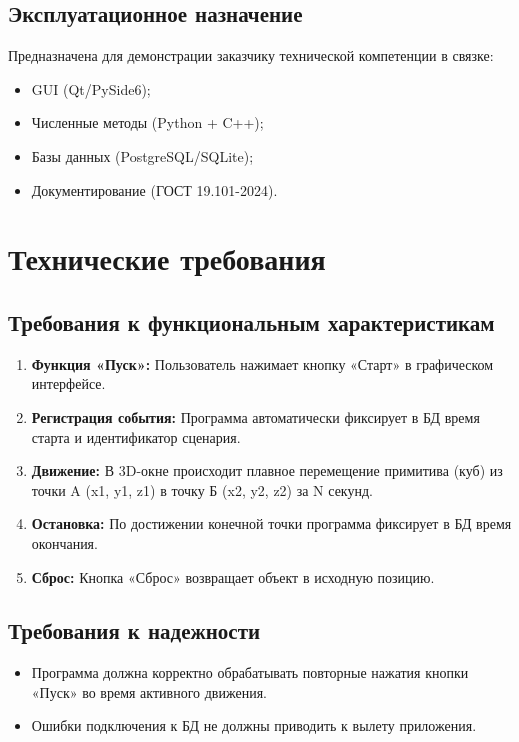\documentclass[a4paper,14pt]{extarticle}
\begin{document}
\subsection{Эксплуатационное назначение}
Предназначена для демонстрации заказчику технической компетенции в связке:
\begin{itemize}
    \item GUI (Qt/PySide6);
    \item Численные методы (Python + C++);
    \item Базы данных (PostgreSQL/SQLite);
    \item Документирование (ГОСТ 19.101-2024).
\end{itemize}

\section{Технические требования}

\subsection{Требования к функциональным характеристикам}
\begin{enumerate}
    \item \textbf{Функция «Пуск»:} Пользователь нажимает кнопку «Старт» в графическом интерфейсе.
    \item \textbf{Регистрация события:} Программа автоматически фиксирует в БД время старта и идентификатор сценария.
    \item \textbf{Движение:} В 3D-окне происходит плавное перемещение примитива (куб) из точки A (x1, y1, z1) в точку Б (x2, y2, z2) за N секунд.
    \item \textbf{Остановка:} По достижении конечной точки программа фиксирует в БД время окончания.
    \item \textbf{Сброс:} Кнопка «Сброс» возвращает объект в исходную позицию.
\end{enumerate}

\subsection{Требования к надежности}
\begin{itemize}
    \item Программа должна корректно обрабатывать повторные нажатия кнопки «Пуск» во время активного движения.
    \item Ошибки подключения к БД не должны приводить к вылету приложения.
\end{itemize}
\end{document}
